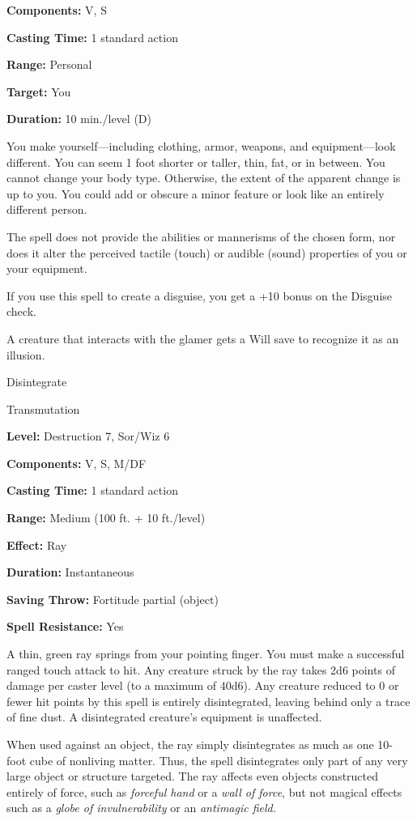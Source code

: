 \documentclass{article}
\begin{document}
\textbf{Components:} V, S

\textbf{Casting Time:} 1 standard action

\textbf{Range:} Personal

\textbf{Target:} You

\textbf{Duration:} 10 min./level (D)

You make yourself---including clothing, armor, weapons, and equipment---look different. 
You can seem 1 foot shorter or taller, thin, fat, or in between. You cannot change 
your body type. Otherwise, the extent of the apparent change is up to you. You 
could add or obscure a minor feature or look like an entirely different person.

The spell does not provide the abilities or mannerisms of the chosen form, nor 
does it alter the perceived tactile (touch) or audible (sound) properties of you 
or your equipment. 

If you use this spell to create a disguise, you get a +10 bonus on the Disguise 
check.

A creature that interacts with the glamer gets a Will save to recognize it as an 
illusion.

\vspace{12pt}
Disintegrate

Transmutation

\textbf{Level:} Destruction 7, Sor/Wiz 6

\textbf{Components:} V, S, M/DF

\textbf{Casting Time:} 1 standard action

\textbf{Range: }Medium (100 ft. + 10 ft./level)

\textbf{Effect:} Ray

\textbf{Duration:} Instantaneous

\textbf{Saving Throw:} Fortitude partial (object)

\textbf{Spell Resistance:} Yes

A thin, green ray springs from your pointing finger. You must make a successful 
ranged touch attack to hit. Any creature struck by the ray takes 2d6 points of 
damage per caster level (to a maximum of 40d6). Any creature reduced to 0 or fewer 
hit points by this spell is entirely disintegrated, leaving behind only a trace 
of fine dust. A disintegrated creature's equipment is unaffected.

When used against an object, the ray simply disintegrates as much as one 10- foot 
cube of nonliving matter. Thus, the spell disintegrates only part of any very large 
object or structure targeted. The ray affects even objects constructed entirely 
of force, such as \textit{forceful hand }or a \textit{wall of force}, but not magical 
effects such as a \textit{globe of invulnerability }or an \textit{antimagic field.}
\end{document}
